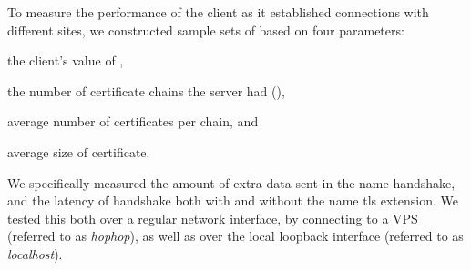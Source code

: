  To measure the performance of the client as it
established connections with different sites, we constructed sample
sets of  based on four parameters:
\begin{inparaenum}
\item the client's value of \numlas,
\item the number of certificate chains the server had (\policy),
\item average number of certificates per chain, and
\item average size of certificate.
\end{inparaenum}
We specifically measured the amount of extra data sent in the
\ac{name} handshake, and the latency of handshake both with and
without the \ac{name} \ac{tls} extension. We tested this both over a
regular network interface, by connecting to a VPS (referred to as
\emph{hophop}), as well as over the local loopback interface (referred
to as \emph{localhost}).


